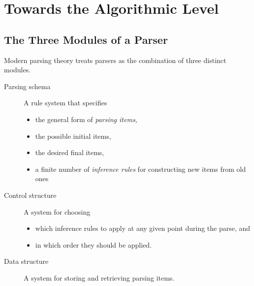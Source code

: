 \section{Towards the Algorithmic Level}
\label{sec:ParserOverview_AlgorithmicLevel}

\subsection{The Three Modules of a Parser}
\label{sub:ParserOverview_Modules}

Modern parsing theory treats parsers as the combination of three distinct modules.
%
\begin{description}
    \item[Parsing schema]
        A rule system that specifies
        \begin{itemize}
            \item the general form of \emph{parsing items},
            \item the possible initial items,
            \item the desired final items,
            \item a finite number of \emph{inference rules} for constructing new items from old ones
        \end{itemize}
    \item[Control structure]
        A system for choosing
        \begin{itemize}
            \item which inference rules to apply at any given point during the parse, and
            \item in which order they should be applied.
        \end{itemize}
    \item[Data structure]
        A system for storing and retrieving parsing items.
\end{description}
%
